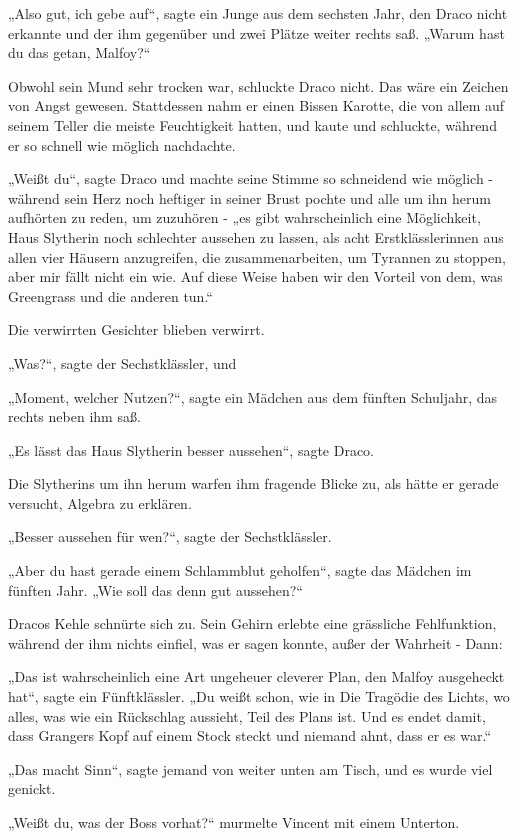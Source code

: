 {„Also gut, ich gebe auf“, sagte ein Junge aus dem sechsten Jahr, den Draco nicht erkannte und der ihm gegenüber und zwei Plätze weiter rechts saß. „Warum hast du das getan, Malfoy?“

Obwohl sein Mund sehr trocken war, schluckte Draco nicht. Das wäre ein Zeichen von Angst gewesen. Stattdessen nahm er einen Bissen Karotte, die von allem auf seinem Teller die meiste Feuchtigkeit hatten, und kaute und schluckte, während er so schnell wie möglich nachdachte.

„Weißt du“, sagte Draco und machte seine Stimme so schneidend wie möglich - während sein Herz noch heftiger in seiner Brust pochte und alle um ihn herum aufhörten zu reden, um zuzuhören - „es gibt wahrscheinlich eine Möglichkeit, Haus Slytherin noch schlechter aussehen zu lassen, als acht Erstklässlerinnen aus allen vier Häusern anzugreifen, die zusammenarbeiten, um Tyrannen zu stoppen, aber mir fällt nicht ein wie. Auf diese Weise haben wir den Vorteil von dem, was Greengrass und die anderen tun.“

Die verwirrten Gesichter blieben verwirrt.

„Was?“, sagte der Sechstklässler, und

„Moment, welcher Nutzen?“, sagte ein Mädchen aus dem fünften Schuljahr, das rechts neben ihm saß.

„Es lässt das Haus Slytherin besser aussehen“, sagte Draco.

Die Slytherins um ihn herum warfen ihm fragende Blicke zu, als hätte er gerade versucht, Algebra zu erklären.

„Besser aussehen für wen?“, sagte der Sechstklässler.

„Aber du hast gerade einem Schlammblut geholfen“, sagte das Mädchen im fünften Jahr. „Wie soll das denn gut aussehen?“

Dracos Kehle schnürte sich zu. Sein Gehirn erlebte eine grässliche Fehlfunktion, während der ihm nichts einfiel, was er sagen konnte, außer der Wahrheit - Dann:

„Das ist wahrscheinlich eine Art ungeheuer cleverer Plan, den Malfoy ausgeheckt hat“, sagte ein Fünftklässler. „Du weißt schon, wie in Die Tragödie des Lichts, wo alles, was wie ein Rückschlag aussieht, Teil des Plans ist. Und es endet damit, dass Grangers Kopf auf einem Stock steckt und niemand ahnt, dass er es war.“

„Das macht Sinn“, sagte jemand von weiter unten am Tisch, und es wurde viel genickt.

„Weißt du, was der Boss vorhat?“ murmelte Vincent mit einem Unterton.

}
